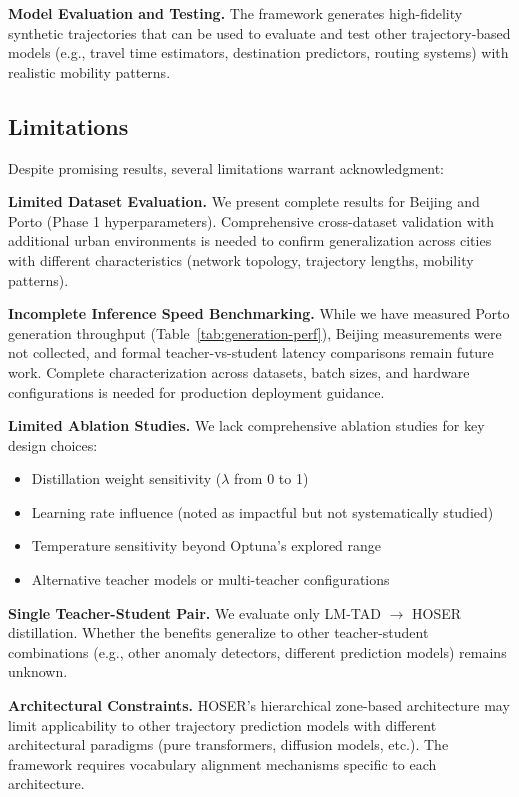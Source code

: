\textbf{Model Evaluation and Testing.} The framework generates high-fidelity synthetic trajectories that can be used to evaluate and test other trajectory-based models (e.g., travel time estimators, destination predictors, routing systems) with realistic mobility patterns.

\subsection{Limitations}
\label{sec:conclusion-limitations}

Despite promising results, several limitations warrant acknowledgment:

\textbf{Limited Dataset Evaluation.} We present complete results for Beijing and Porto (Phase 1 hyperparameters). Comprehensive cross-dataset validation with additional urban environments is needed to confirm generalization across cities with different characteristics (network topology, trajectory lengths, mobility patterns).

\textbf{Incomplete Inference Speed Benchmarking.} While we have measured Porto generation throughput (Table~\ref{tab:generation-perf}), Beijing measurements were not collected, and formal teacher-vs-student latency comparisons remain future work. Complete characterization across datasets, batch sizes, and hardware configurations is needed for production deployment guidance.

\textbf{Limited Ablation Studies.} We lack comprehensive ablation studies for key design choices:
\begin{itemize}[noitemsep,topsep=0pt]
    \item Distillation weight sensitivity ($\lambda$ from 0 to 1)
    \item Learning rate influence (noted as impactful but not systematically studied)
    \item Temperature sensitivity beyond Optuna's explored range
    \item Alternative teacher models or multi-teacher configurations
\end{itemize}

\textbf{Single Teacher-Student Pair.} We evaluate only LM-TAD $\rightarrow$ HOSER distillation. Whether the benefits generalize to other teacher-student combinations (e.g., other anomaly detectors, different prediction models) remains unknown.

\textbf{Architectural Constraints.} HOSER's hierarchical zone-based architecture may limit applicability to other trajectory prediction models with different architectural paradigms (pure transformers, diffusion models, etc.). The framework requires vocabulary alignment mechanisms specific to each architecture.


